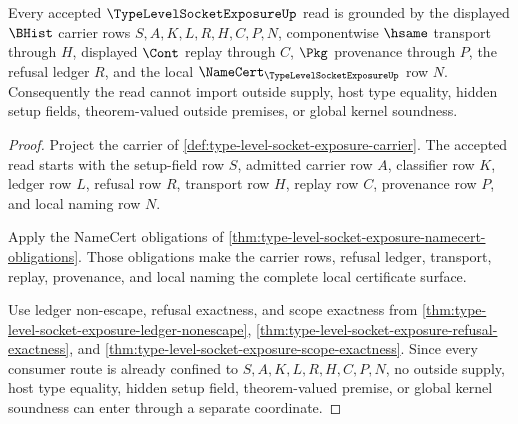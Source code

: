 \begin{theorem}
\label{thm:type-level-socket-exposure-scope-kernel-grounding}
Every accepted $\TypeLevelSocketExposureUp$ read is grounded by the displayed $\BHist$ carrier rows $S,A,K,L,R,H,C,P,N$, componentwise $\hsame$ transport through $H$, displayed $\Cont$ replay through $C$, $\Pkg$ provenance through $P$, the refusal ledger $R$, and the local $\NameCert_{\TypeLevelSocketExposureUp}$ row $N$. Consequently the read cannot import outside supply, host type equality, hidden setup fields, theorem-valued outside premises, or global kernel soundness.
\end{theorem}
\begin{proof}
Project the carrier of \autoref{def:type-level-socket-exposure-carrier}. The accepted read starts with the setup-field row $S$, admitted carrier row $A$, classifier row $K$, ledger row $L$, refusal row $R$, transport row $H$, replay row $C$, provenance row $P$, and local naming row $N$.

Apply the NameCert obligations of \autoref{thm:type-level-socket-exposure-namecert-obligations}. Those obligations make the carrier rows, refusal ledger, transport, replay, provenance, and local naming the complete local certificate surface.

Use ledger non-escape, refusal exactness, and scope exactness from \autoref{thm:type-level-socket-exposure-ledger-nonescape}, \autoref{thm:type-level-socket-exposure-refusal-exactness}, and \autoref{thm:type-level-socket-exposure-scope-exactness}. Since every consumer route is already confined to $S,A,K,L,R,H,C,P,N$, no outside supply, host type equality, hidden setup field, theorem-valued premise, or global kernel soundness can enter through a separate coordinate.
\end{proof}

